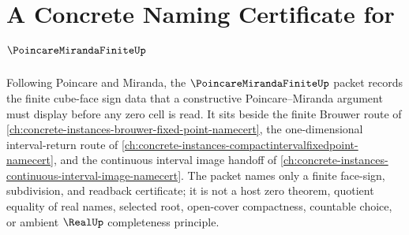 \chapter{A Concrete Naming Certificate for $\PoincareMirandaFiniteUp$}
\label{ch:concrete-instances-poincare-miranda-finite-namecert}

Following Poincare and Miranda, the $\PoincareMirandaFiniteUp$ packet records the finite cube-face sign data that a constructive Poincare--Miranda argument must display before any zero cell is read. It sits beside the finite Brouwer route of \autoref{ch:concrete-instances-brouwer-fixed-point-namecert}, the one-dimensional interval-return route of \autoref{ch:concrete-instances-compactintervalfixedpoint-namecert}, and the continuous interval image handoff of \autoref{ch:concrete-instances-continuous-interval-image-namecert}. The packet names only a finite face-sign, subdivision, and readback certificate; it is not a host zero theorem, quotient equality of real names, selected root, open-cover compactness, countable choice, or ambient $\RealUp$ completeness principle.

